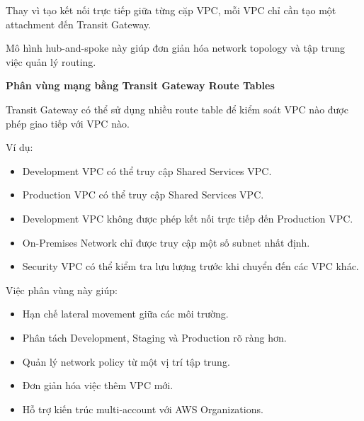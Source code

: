 Thay vì tạo kết nối trực tiếp giữa từng cặp VPC, mỗi VPC chỉ cần tạo một
attachment đến Transit Gateway.

\begin{Shaded}
\begin{Highlighting}[]
\NormalTok{                    |}
\NormalTok{                    |}
\NormalTok{                    |}
\NormalTok{                    |}
\end{Highlighting}
\end{Shaded}

Mô hình hub-and-spoke này giúp đơn giản hóa network topology và tập
trung việc quản lý routing.

\vspace{0.5em}\noindent\textbf{Phân vùng mạng bằng Transit Gateway Route
Tables}\par

Transit Gateway có thể sử dụng nhiều route table để kiểm soát VPC nào
được phép giao tiếp với VPC nào.

Ví dụ:

\begin{itemize}
\tightlist
\item
  Development VPC có thể truy cập Shared Services VPC.
\item
  Production VPC có thể truy cập Shared Services VPC.
\item
  Development VPC không được phép kết nối trực tiếp đến Production VPC.
\item
  On-Premises Network chỉ được truy cập một số subnet nhất định.
\item
  Security VPC có thể kiểm tra lưu lượng trước khi chuyển đến các VPC
  khác.
\end{itemize}

Việc phân vùng này giúp:

\begin{itemize}
\tightlist
\item
  Hạn chế lateral movement giữa các môi trường.
\item
  Phân tách Development, Staging và Production rõ ràng hơn.
\item
  Quản lý network policy từ một vị trí tập trung.
\item
  Đơn giản hóa việc thêm VPC mới.
\item
  Hỗ trợ kiến trúc multi-account với AWS Organizations.
\end{itemize}


